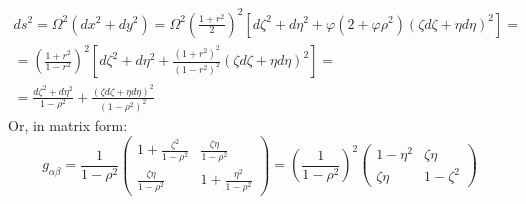 \documentclass{article}
\begin{document}
\begin{equation}
\begin{gathered}
    ds^2 = \Omega^2(dx^2 + dy^2) = \Omega^2\left(\frac{1+r^2}{2}\right)^2\left[d\zeta^2 + d\eta^2
        + \varphi(2 + \varphi\rho^2)(\zeta d\zeta + \eta d\eta)^2
    \right] = \\ =
    \left(\frac{1+r^2}{1-r^2}\right)^2\left[d\zeta^2 + d\eta^2
        + \frac{(1+r^2)^2}{(1-r^2)^2}(\zeta d\zeta + \eta d\eta)^2
    \right] = \\ = \frac{d\zeta^2 + d\eta^2}{1-\rho^2} + \frac{(\zeta d\zeta + \eta d\eta)^2}{(1-\rho^2)^2}
\end{gathered}
\end{equation}
Or, in matrix form:
\begin{equation}
    g_{\alpha\beta} = \frac{1}{1-\rho^2}\begin{pmatrix}
        1 + \frac{\zeta^2}{1-\rho^2} & \frac{\zeta\eta}{1-\rho^2} \\
        \frac{\zeta\eta}{1-\rho^2} & 1 + \frac{\eta^2}{1-\rho^2}
    \end{pmatrix} = \left(\frac{1}{1-\rho^2}\right)^2\begin{pmatrix}
        1 - \eta^2 & \zeta\eta \\ \zeta\eta & 1 - \zeta^2
    \end{pmatrix}
\end{equation}
\end{document}
